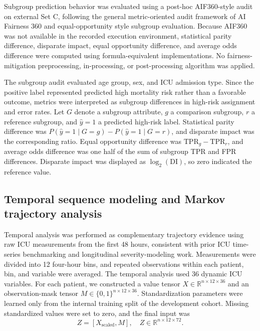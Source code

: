 \documentclass[10pt,twocolumn,letterpaper]{article}
\begin{document}
Subgroup prediction behavior was evaluated using a post-hoc AIF360-style audit on external Set C, following the general metric-oriented audit framework of AI Fairness 360 and equal-opportunity style subgroup evaluation\cite{bellamy2019aif360,hardt2016equality}. Because AIF360 was not available in the recorded execution environment, statistical parity difference, disparate impact, equal opportunity difference, and average odds difference were computed using formula-equivalent implementations. No fairness-mitigation preprocessing, in-processing, or post-processing algorithm was applied.

The subgroup audit evaluated age group, sex, and ICU admission type. Since the positive label represented predicted high mortality risk rather than a favorable outcome, metrics were interpreted as subgroup differences in high-risk assignment and error rates. Let $G$ denote a subgroup attribute, $g$ a comparison subgroup, $r$ a reference subgroup, and $\hat{y}=1$ a predicted high-risk label. Statistical parity difference was $P(\hat{y}=1 \mid G=g)-P(\hat{y}=1 \mid G=r)$, and disparate impact was the corresponding ratio. Equal opportunity difference was $\mathrm{TPR}_g-\mathrm{TPR}_r$, and average odds difference was one half of the sum of subgroup TPR and FPR differences. Disparate impact was displayed as $\log_2(\mathrm{DI})$, so zero indicated the reference value.

\subsection{Temporal sequence modeling and Markov trajectory analysis}

Temporal analysis was performed as complementary trajectory evidence using raw ICU measurements from the first 48 hours, consistent with prior ICU time-series benchmarking and longitudinal severity-modeling work\cite{harutyunyan2019benchmarking,shickel2019deepsofa}. Measurements were divided into 12 four-hour bins, and repeated observations within each patient, bin, and variable were averaged. The temporal analysis used 36 dynamic ICU variables. For each patient, we constructed a value tensor $X \in \mathbb{R}^{n \times 12 \times 36}$ and an observation-mask tensor $M \in \{0,1\}^{n \times 12 \times 36}$. Standardization parameters were learned only from the internal training split of the development cohort. Missing standardized values were set to zero, and the final input was
\begin{equation}
Z=[X_{\mathrm{scaled}},M],
\quad
Z \in \mathbb{R}^{n \times 12 \times 72}.
\end{equation}
\end{document}
